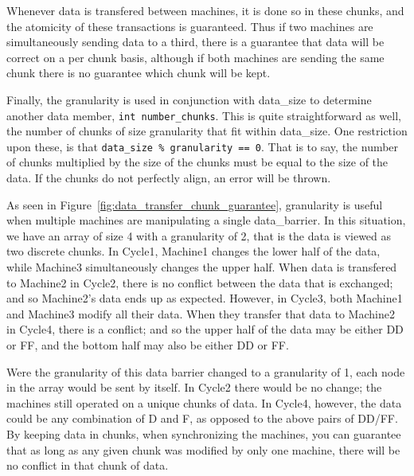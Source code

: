 \documentclass[../thesis.tex]{subfiles}
\begin{document}
    Whenever data is transfered between machines, it is done so in these chunks, and the atomicity of these transactions is guaranteed. Thus if two machines are simultaneously sending data to a third, there is a guarantee that data will be correct on a per chunk basis, although if both machines are sending the same chunk there is no guarantee which chunk will be kept.

    Finally, the granularity is used in conjunction with data\_size to determine another data member, \texttt{int number\_chunks}. This is quite straightforward as well, the number of chunks of size granularity that fit within data\_size. One restriction upon these, is that \texttt{data\_size \% granularity == 0}. That is to say, the number of chunks multiplied by the size of the chunks must be equal to the size of the data. If the chunks do not perfectly align, an error will be thrown.
 
    As seen in Figure~\ref{fig:data_transfer_chunk_guarantee}, granularity is useful when multiple machines are manipulating a single data\_barrier. In this situation, we have an array of size 4 with a granularity of 2, that is the data is viewed as two discrete chunks. In Cycle1, Machine1 changes the lower half of the data, while Machine3 simultaneously changes the upper half. When data is transfered to Machine2 in Cycle2, there is no conflict between the data that is exchanged; and so Machine2's data ends up as expected. However, in Cycle3, both Machine1 and Machine3 modify all their data. When they transfer that data to Machine2 in Cycle4, there is a conflict; and so the upper half of the data may be either DD or FF, and the bottom half may also be either DD or FF.

    Were the granularity of this data barrier changed to a granularity of 1, each node in the array would be sent by itself. In Cycle2 there would be no change; the machines still operated on a unique chunks of data. In Cycle4, however, the data could be any combination of D and F, as opposed to the above pairs of DD/FF. By keeping data in chunks, when synchronizing the machines, you can guarantee that as long as any given chunk was modified by only one machine, there will be no conflict in that chunk of data.
\end{document}
